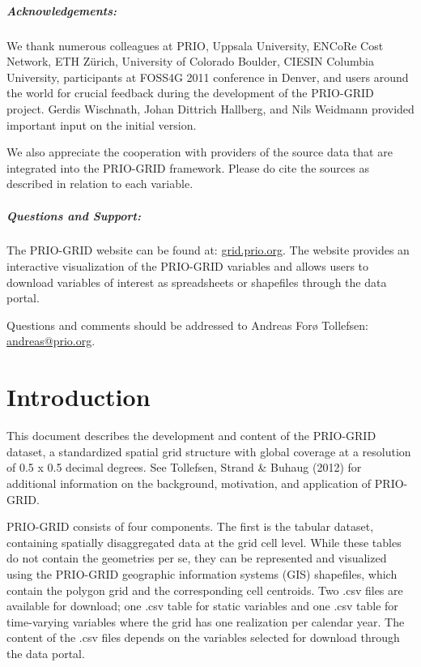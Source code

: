 \documentclass[]{book}
\begin{document}
\paragraph{Acknowledgements:}\label{acknowledgements}

We thank numerous colleagues at PRIO, Uppsala University, ENCoRe Cost
Network, ETH Zürich, University of Colorado Boulder, CIESIN Columbia
University, participants at FOSS4G 2011 conference in Denver, and users
around the world for crucial feedback during the development of the
PRIO-GRID project. Gerdis Wischnath, Johan Dittrich Hallberg, and Nils
Weidmann provided important input on the initial version.

We also appreciate the cooperation with providers of the source data
that are integrated into the PRIO-GRID framework. Please do cite the
sources as described in relation to each variable.

\paragraph{Questions and Support:}\label{questions-and-support}

The PRIO-GRID website can be found at:
\href{http://grid.prio.org}{grid.prio.org}. The website provides an
interactive visualization of the PRIO-GRID variables and allows users to
download variables of interest as spreadsheets or shapefiles through the
data portal.

Questions and comments should be addressed to Andreas Forø Tollefsen:
\href{mailto:andreas@prio.no}{andreas@prio.org}.

\mainmatter

\chapter{Introduction}\label{introduction}

This document describes the development and content of the PRIO-GRID
dataset, a standardized spatial grid structure with global coverage at a
resolution of 0.5 x 0.5 decimal degrees. See Tollefsen, Strand \& Buhaug
(2012) for additional information on the background, motivation, and
application of PRIO-GRID.

PRIO-GRID consists of four components. The first is the tabular dataset,
containing spatially disaggregated data at the grid cell level. While
these tables do not contain the geometries per se, they can be
represented and visualized using the PRIO-GRID geographic information
systems (GIS) shapefiles, which contain the polygon grid and the
corresponding cell centroids. Two .csv files are available for download;
one .csv table for static variables and one .csv table for time-varying
variables where the grid has one realization per calendar year. The
content of the .csv files depends on the variables selected for download
through the data portal.
\end{document}
